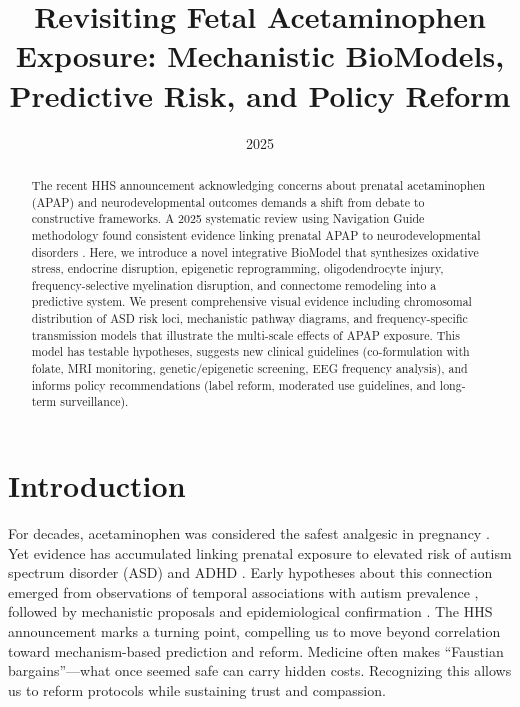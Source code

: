 \documentclass[12pt]{article}
\title{Revisiting Fetal Acetaminophen Exposure: Mechanistic BioModels, Predictive Risk, and Policy Reform}
\author{}
\date{2025}
\begin{document}
\maketitle 

\begin{abstract}
The recent HHS announcement acknowledging concerns about prenatal acetaminophen (APAP) and neurodevelopmental outcomes demands a shift from debate to constructive frameworks. A 2025 systematic review using Navigation Guide methodology found consistent evidence linking prenatal APAP to neurodevelopmental disorders \citep{navarro2025}. Here, we introduce a novel integrative BioModel that synthesizes oxidative stress, endocrine disruption, epigenetic reprogramming, oligodendrocyte injury, frequency-selective myelination disruption, and connectome remodeling into a predictive system. We present comprehensive visual evidence including chromosomal distribution of ASD risk loci, mechanistic pathway diagrams, and frequency-specific transmission models that illustrate the multi-scale effects of APAP exposure. This model has testable hypotheses, suggests new clinical guidelines (co-formulation with folate, MRI monitoring, genetic/epigenetic screening, EEG frequency analysis), and informs policy recommendations (label reform, moderated use guidelines, and long-term surveillance).
\end{abstract}

\section{Introduction}
For decades, acetaminophen was considered the safest analgesic in pregnancy \citep{kristensen2016}. Yet evidence has accumulated linking prenatal exposure to elevated risk of autism spectrum disorder (ASD) and ADHD \citep{masarwa2018,chen2023}. Early hypotheses about this connection emerged from observations of temporal associations with autism prevalence \citep{schultz2008,torres2003,shaw2013}, followed by mechanistic proposals \citep{parker2020} and epidemiological confirmation \citep{liew2016,avella2016}. The HHS announcement marks a turning point, compelling us to move beyond correlation toward mechanism-based prediction and reform. Medicine often makes ``Faustian bargains''---what once seemed safe can carry hidden costs. Recognizing this allows us to reform protocols while sustaining trust and compassion.
\end{document}
